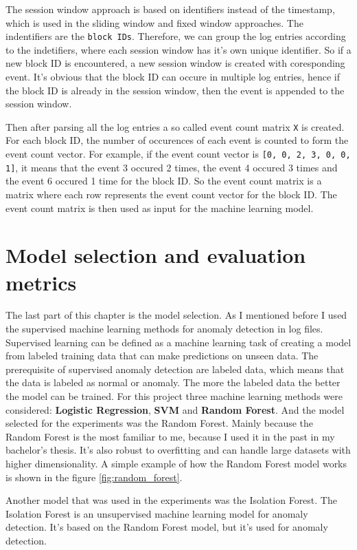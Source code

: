 The session window approach is based on identifiers instead of the timestamp, which is used in the sliding window and fixed window approaches. 
The indentifiers are the \texttt{block IDs}. Therefore, we can group the log entries according to the indetifiers, where each session window has it's own unique identifier.
So if a new block ID is encountered, a new session window is created with coresponding event. It's obvious that the block ID can occure in multiple log entries, hence if the block ID is already in the session window, then the event is appended to the session window.

Then after parsing all the log entries a so called event count matrix \texttt{X} is created. For each block ID, the number of occurences of each event is counted to form the event count vector.
For example, if the event count vector is \texttt{[0, 0, 2, 3, 0, 0, 1]}, it means that the event 3 occured 2 times, the event 4 occured 3 times and the event 6 occured 1 time for the block ID.
So the event count matrix is a matrix where each row represents the event count vector for the block ID. The event count matrix is then used as input for the machine learning model.

\section{Model selection and evaluation metrics} \label{model}

The last part of this chapter is the model selection. As I mentioned before I used the supervised machine learning methods for anomaly detection in log files. Supervised learning can be defined 
as a machine learning task of creating a model from labeled training data that can make predictions on unseen data.
The prerequisite of supervised anomaly detection are labeled data, which means that the data is labeled as normal or anomaly. The more the labeled data the better the model can be trained.
For this project three machine learning methods were considered: \textbf{Logistic Regression}, \textbf{SVM} and \textbf{Random Forest}. And the model selected for the experiments was the Random Forest.
Mainly because the Random Forest is the most familiar to me, because I used it in the past in my bachelor's thesis. It's also robust to overfitting and can handle large datasets with higher dimensionality.
A simple example of how the Random Forest model works is shown in the figure \ref{fig:random_forest}.

Another model that was used in the experiments was the Isolation Forest. %
The Isolation Forest is an unsupervised machine learning model for anomaly detection. It's based on the Random Forest model, but it's used for anomaly detection.

